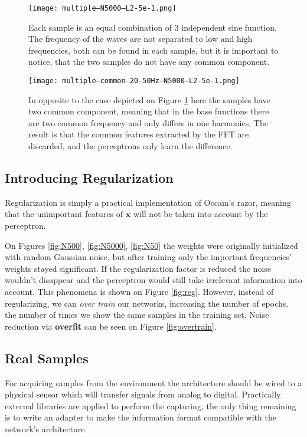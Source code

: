 \begin{figure}
	\centering
	\texttt{[image: multiple---N5000---L2-5e-1.png]}
	\caption{Each sample is an equal combination of 3 independent sine function. The frequency of the waves are not separated to low and high frequencies, both can be found in each sample, but it is important to notice, that the two samples do not have any common component.}
	
	\label{fig:multi}
\end{figure}


\begin{figure}
	\centering
	\texttt{[image: multiple--common-20-50Hz--N5000---L2-5e-1.png]}
	\caption{In opposite to the case depicted on Figure \ref{fig:multi} here the samples have two common component, meaning that in the base functions there are two common frequency and only differs in one harmonics. The result is that the common features extracted by the FFT are discarded, and the perceptrons only learn the difference.}
	
	\label{fig:multi-common}
\end{figure}

\subsection{Introducing Regularization}
Regularization is simply a practical implementation of Occam's razor, meaning that the unimportant features of $\mathbf{x}$ will not be taken into account by the perceptron. 

On Figures \ref{fig:N500}, \ref{fig:N5000}, \ref{fig:N50} the weights were originally initialized with random Gaussian noise, but after training only the important frequencies' weights stayed significant. 
If the regularization factor is reduced the noise wouldn't disappear and the perceptron would still take irrelevant information into account. 
This phenomena is shown on Figure \ref{fig:reg}. 
However, instead of regularizing, we can \emph{over train} our networks, increasing the number of epochs, the number of times we show the same samples in the training set. 
Noise reduction via \textbf{overfit} can be seen on Figure \ref{fig:overtrain}. 

\subsection{Real Samples}
For acquiring samples from the environment the architecture should be wired to a physical sensor which will transfer signals from analog to digital. 
Practically external libraries are applied to perform the capturing, the only thing remaining is to write an adapter to make the information format compatible with the network's architecture.

